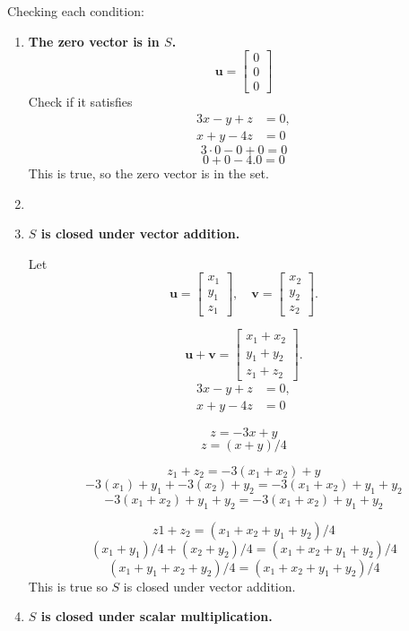 Checking each condition:
\begin{enumerate}
    \item \textbf{The zero vector is in \( S \).}
    \[
    \mathbf{u} = 
    \begin{bmatrix} 
    0 \\ 0 \\ 0
    \end{bmatrix}
    \]
    Check if it satisfies 
    \[
     \begin{aligned}
    3x - y + z &= 0, \\
    x + y - 4z &= 0
    \end{aligned}
    \]
     \[
    3 \cdot 0 - 0 + 0 = 0
    \]
     \[
    0 + 0 - 4.0 = 0
    \]
    This is true, so the zero vector is in the set.
  \item 
   \item \textbf{\( S \) is closed under vector addition.}

    Let 
    \[
    \mathbf{u} = 
    \begin{bmatrix} 
    x_1 \\ y_1 \\ z_1
    \end{bmatrix}, \quad 
    \mathbf{v} = 
    \begin{bmatrix} 
    x_2 \\ y_2 \\ z_2
    \end{bmatrix}.
    \]

    \[
    \mathbf{u} + \mathbf{v} = 
    \begin{bmatrix} 
    x_1 + x_2 \\ y_1 + y_2 \\ z_1 + z_2
    \end{bmatrix}.
    \]
    \[
     \begin{aligned}
    3x - y + z &= 0, \\
    x + y - 4z &= 0
    \end{aligned}
    \]
    
    \[
     z = -3x + y \]
    \[
     z = (x+y)/4
    \]
    
    \[
    z_1 + z_2 = -3(x_1+x_2) +y
    \]
    \[
    -3(x_1)+y_1 + -3(x_2)+y_2 = -3(x_1+x_2) +y_1+y_2
    \]
    \[
    -3(x_1+x_2)+y_1+y_2 = -3(x_1+x_2) +y_1+y_2
    \]
    
    \[
    z1 + z_2 = (x_1+x_2+y_1+y_2)/4
    \]
    \[
    (x_1+y_1)/4 + (x_2+y_2)/4 = (x_1+x_2+y_1+y_2)/4
    \]
    \[
    (x_1+y_1 + x_2+y_2)/4 = (x_1+x_2+y_1+y_2)/4
    \]
    This is true so \( S \) is closed under vector addition.
    \item \textbf{\( S \) is closed under scalar multiplication.}


\end{enumerate}
